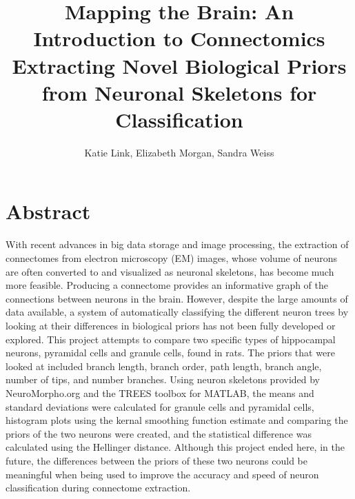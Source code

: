 \documentclass[11pt]{article} %
\title{Mapping the Brain: An Introduction to Connectomics\\Extracting Novel Biological Priors from Neuronal Skeletons for Classification}
\author{Katie Link, Elizabeth Morgan, Sandra Weiss}
\begin{document}
\maketitle

\section{Abstract}
	With recent advances in big data storage and image processing, the extraction of connectomes from electron microscopy (EM) images, whose volume of neurons are often converted to and visualized as neuronal skeletons, has become much more feasible. Producing a connectome provides an informative graph of the connections between neurons in the brain. However, despite the large amounts of data available, a  system of automatically classifying the different neuron trees by looking at their differences in biological priors has not been fully developed or explored. This project attempts to compare two specific types of hippocampal neurons, pyramidal cells and granule cells, found in rats. The priors that were looked at included branch length, branch order, path length, branch angle, number of tips, and number branches. Using neuron skeletons provided by NeuroMorpho.org and the TREES toolbox for MATLAB, the means and standard deviations were calculated for granule cells and pyramidal cells, histogram plots using the kernal smoothing function estimate and comparing the priors of the two neurons were created, and the statistical difference was calculated using the Hellinger distance. Although this project ended here, in the future, the differences between the priors of these two neurons could be meaningful when being used to improve the accuracy and speed of neuron classification during connectome extraction.
\end{document}
